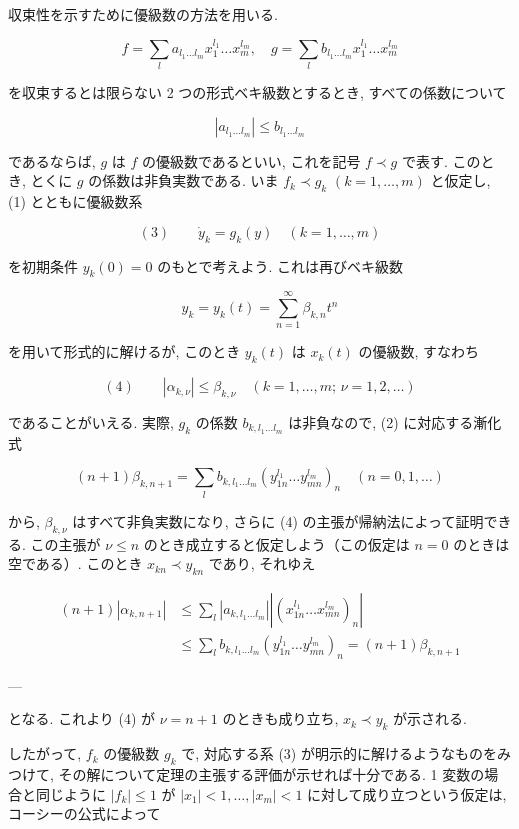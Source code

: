 \documentclass[dvipdfmx, leqno]{jsbook}
\begin{document}
収束性を示すために優級数の方法を用いる.

$$f = \sum_{l} a_{l_1 \dots l_m} x_1^{l_1} \dots x_m^{l_m}, \quad g = \sum_{l} b_{l_1 \dots l_m} x_1^{l_1} \dots x_m^{l_m}$$

を収束するとは限らない 2 つの形式ベキ級数とするとき, すべての係数について

$$|a_{l_1 \dots l_m}| \leq b_{l_1 \dots l_m}$$

であるならば, $g$ は $f$ の優級数であるといい, これを記号 $f \prec g$ で表す. このとき, とくに $g$ の係数は非負実数である. いま $f_k \prec g_k$ $(k=1,\dots,m)$ と仮定し, (1) とともに優級数系

$$(3) \qquad \dot{y}_k = g_k(y) \quad (k=1,\dots,m)$$

を初期条件 $y_k(0) = 0$ のもとで考えよう. これは再びベキ級数

$$y_k = y_k(t) = \sum_{n=1}^{\infty} \beta_{k,n} t^n$$

を用いて形式的に解けるが, このとき $y_k(t)$ は $x_k(t)$ の優級数, すなわち

$$(4) \qquad |\alpha_{k,\nu}| \leq \beta_{k,\nu} \quad (k=1,\dots,m; \, \nu = 1,2,\dots)$$

であることがいえる. 実際, $g_k$ の係数 $b_{k, l_1 \dots l_m}$ は非負なので, (2) に対応する漸化式

$$(n+1)\beta_{k,n+1} = \sum_{l} b_{k, l_1 \dots l_m} (y_{1n}^{l_1} \dots y_{mn}^{l_m})_n \quad (n=0,1,\dots)$$

から, $\beta_{k,\nu}$ はすべて非負実数になり, さらに (4) の主張が帰納法によって証明できる. この主張が $\nu \leq n$ のとき成立すると仮定しよう（この仮定は $n=0$ のときは空である）. このとき $x_{kn} \prec y_{kn}$ であり, それゆえ

$$\begin{aligned} (n+1)|\alpha_{k,n+1}| &\leq \sum_{l} |a_{k, l_1 \dots l_m}| |(x_{1n}^{l_1} \dots x_{mn}^{l_m})_n| \\ &\leq \sum_{l} b_{k, l_1 \dots l_m} (y_{1n}^{l_1} \dots y_{mn}^{l_m})_n = (n+1)\beta_{k,n+1} \end{aligned}$$

---

となる. これより (4) が $\nu = n+1$ のときも成り立ち, $x_k \prec y_k$ が示される.

したがって, $f_k$ の優級数 $g_k$ で, 対応する系 (3) が明示的に解けるようなものをみつけて, その解について定理の主張する評価が示せれば十分である. 1 変数の場合と同じように $|f_k| \leq 1$ が $|x_1| < 1, \dots, |x_m| < 1$ に対して成り立つという仮定は, コーシーの公式によって
\end{document}
